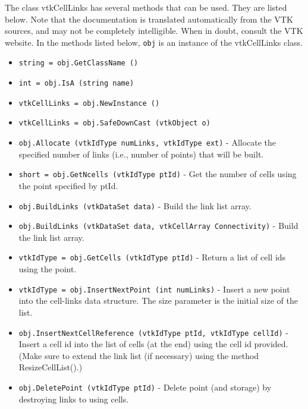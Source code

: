 The class vtkCellLinks has several methods that can be used.
  They are listed below.
Note that the documentation is translated automatically from the VTK sources,
and may not be completely intelligible.  When in doubt, consult the VTK website.
In the methods listed below, \verb|obj| is an instance of the vtkCellLinks class.
\begin{itemize}
\item  \verb|string = obj.GetClassName ()|

\item  \verb|int = obj.IsA (string name)|

\item  \verb|vtkCellLinks = obj.NewInstance ()|

\item  \verb|vtkCellLinks = obj.SafeDownCast (vtkObject o)|

\item  \verb|obj.Allocate (vtkIdType numLinks, vtkIdType ext)| -  Allocate the specified number of links (i.e., number of points) that
 will be built.

\item  \verb|short = obj.GetNcells (vtkIdType ptId)| -  Get the number of cells using the point specified by ptId.

\item  \verb|obj.BuildLinks (vtkDataSet data)| -  Build the link list array.

\item  \verb|obj.BuildLinks (vtkDataSet data, vtkCellArray Connectivity)| -  Build the link list array.

\item  \verb|vtkIdType = obj.GetCells (vtkIdType ptId)| -  Return a list of cell ids using the point.

\item  \verb|vtkIdType = obj.InsertNextPoint (int numLinks)| -  Insert a new point into the cell-links data structure. The size parameter
 is the initial size of the list.

\item  \verb|obj.InsertNextCellReference (vtkIdType ptId, vtkIdType cellId)| -  Insert a cell id into the list of cells (at the end) using the cell id 
 provided. (Make sure to extend the link list (if necessary) using the
 method ResizeCellList().)

\item  \verb|obj.DeletePoint (vtkIdType ptId)| -  Delete point (and storage) by destroying links to using cells.


\end{itemize}
